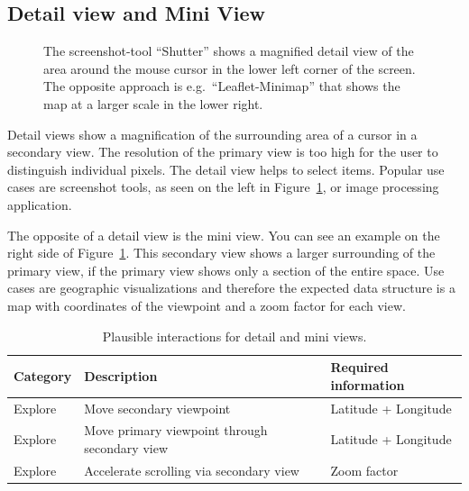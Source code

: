 \subsection{Detail view and Mini View}
\begin{figure}
  \centering
  \qquad
  \caption{
    The screenshot-tool ``Shutter'' shows a magnified detail view of the area around the mouse cursor in the lower left corner of the screen.
  The opposite approach is e.g.\ ``Leaflet-Minimap'' that shows the map at a larger scale in the lower right.
  }
  \label{fig:analysis:detail}
\end{figure}

Detail views show a magnification of the surrounding area of a cursor in a secondary view.
The resolution of the primary view is too high for the user to distinguish individual pixels.
The detail view helps to select items.
Popular use cases are screenshot tools, as seen on the left in Figure~\ref{fig:analysis:detail}, or image processing application.

The opposite of a detail view is the mini view.
You can see an example on the right side of Figure~\ref{fig:analysis:detail}.
This secondary view shows a larger surrounding of the primary view, if the primary view shows only a section of the entire space.
Use cases are geographic visualizations and therefore the expected data structure is a map with coordinates of the viewpoint and a zoom factor for each view.

\begin{table}[H]
  \caption{Plausible interactions for detail and mini views.}%
  \label{fig:analysis:detail:interactions}
  \begin{tabular*}{\textwidth}{lll}
    \bf Category & \bf Description & \bf Required information \\
    \hline
    Explore & Move secondary viewpoint & Latitude + Longitude \\
    Explore & Move primary viewpoint through secondary view & Latitude + Longitude \\
    Explore & Accelerate scrolling via secondary view & Zoom factor \\
  \end{tabular*}
\end{table}

